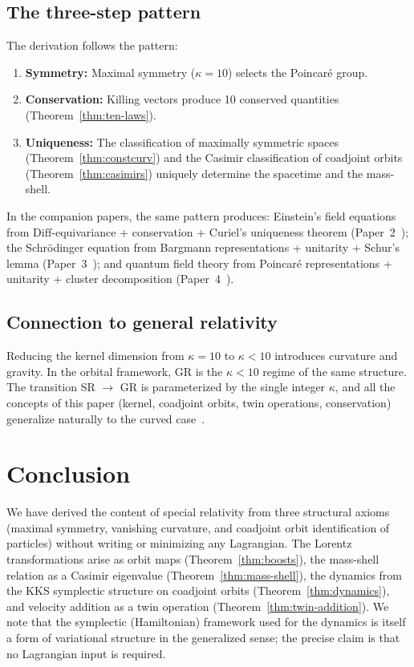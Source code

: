\documentclass[12pt]{article}
\theoremstyle{plain}
\theoremstyle{definition}
\theoremstyle{remark}
\newcommand{\Diff}{\mathrm{Diff}}
\begin{document}
\subsection{The three-step pattern}

The derivation follows the pattern:
\begin{enumerate}
    \item \textbf{Symmetry:} Maximal symmetry ($\kappa = 10$) selects the Poincar\'e group.
    \item \textbf{Conservation:} Killing vectors produce 10 conserved quantities (Theorem~\ref{thm:ten-laws}).
    \item \textbf{Uniqueness:} The classification of maximally symmetric spaces (Theorem~\ref{thm:constcurv}) and the Casimir classification of coadjoint orbits (Theorem~\ref{thm:casimirs}) uniquely determine the spacetime and the mass-shell.
\end{enumerate}

In the companion papers, the same pattern produces: Einstein's field equations from $\Diff$-equivariance + conservation + Curiel's uniqueness theorem (Paper~2~\cite{nembe2026p2}); the Schr\"odinger equation from Bargmann representations + unitarity + Schur's lemma (Paper~3~\cite{nembe2026p3}); and quantum field theory from Poincar\'e representations + unitarity + cluster decomposition (Paper~4~\cite{nembe2026p4}).

\subsection{Connection to general relativity}

Reducing the kernel dimension from $\kappa = 10$ to $\kappa < 10$ introduces curvature and gravity. In the orbital framework, GR is the $\kappa < 10$ regime of the same structure. The transition SR $\to$ GR is parameterized by the single integer $\kappa$, and all the concepts of this paper (kernel, coadjoint orbits, twin operations, conservation) generalize naturally to the curved case~\cite{nembe2026vol17}.


\section{Conclusion}
\label{sec:conclusion}

We have derived the content of special relativity from three structural axioms (maximal symmetry, vanishing curvature, and coadjoint orbit identification of particles) without writing or minimizing any Lagrangian. The Lorentz transformations arise as orbit maps (Theorem~\ref{thm:boosts}), the mass-shell relation as a Casimir eigenvalue (Theorem~\ref{thm:mass-shell}), the dynamics from the KKS symplectic structure on coadjoint orbits (Theorem~\ref{thm:dynamics}), and velocity addition as a twin operation (Theorem~\ref{thm:twin-addition}). We note that the symplectic (Hamiltonian) framework used for the dynamics is itself a form of variational structure in the generalized sense; the precise claim is that no Lagrangian input is required.
\end{document}
